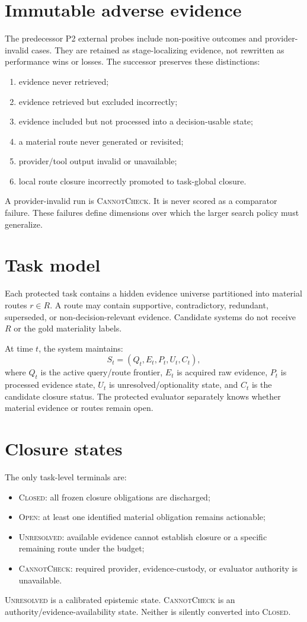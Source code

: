 \documentclass[11pt]{article}
\begin{document}
\section{Immutable adverse evidence}
The predecessor P2 external probes include non-positive outcomes and provider-invalid cases. They are retained as stage-localizing evidence, not rewritten as performance wins or losses. The successor preserves these distinctions:
\begin{enumerate}
    \item evidence never retrieved;
    \item evidence retrieved but excluded incorrectly;
    \item evidence included but not processed into a decision-usable state;
    \item a material route never generated or revisited;
    \item provider/tool output invalid or unavailable;
    \item local route closure incorrectly promoted to task-global closure.
\end{enumerate}
A provider-invalid run is \textsc{CannotCheck}. It is never scored as a comparator failure. These failures define dimensions over which the larger search policy must generalize.

\section{Task model}
Each protected task contains a hidden evidence universe partitioned into material routes $r\in R$. A route may contain supportive, contradictory, redundant, superseded, or non-decision-relevant evidence. Candidate systems do not receive $R$ or the gold materiality labels.

At time $t$, the system maintains:
\[
S_t=(Q_t,E_t,P_t,U_t,C_t),
\]
where $Q_t$ is the active query/route frontier, $E_t$ is acquired raw evidence, $P_t$ is processed evidence state, $U_t$ is unresolved/optionality state, and $C_t$ is the candidate closure status. The protected evaluator separately knows whether material evidence or routes remain open.

\section{Closure states}
The only task-level terminals are:
\begin{itemize}
    \item \textsc{Closed}: all frozen closure obligations are discharged;
    \item \textsc{Open}: at least one identified material obligation remains actionable;
    \item \textsc{Unresolved}: available evidence cannot establish closure or a specific remaining route under the budget;
    \item \textsc{CannotCheck}: required provider, evidence-custody, or evaluator authority is unavailable.
\end{itemize}
\textsc{Unresolved} is a calibrated epistemic state. \textsc{CannotCheck} is an authority/evidence-availability state. Neither is silently converted into \textsc{Closed}.
\end{document}
